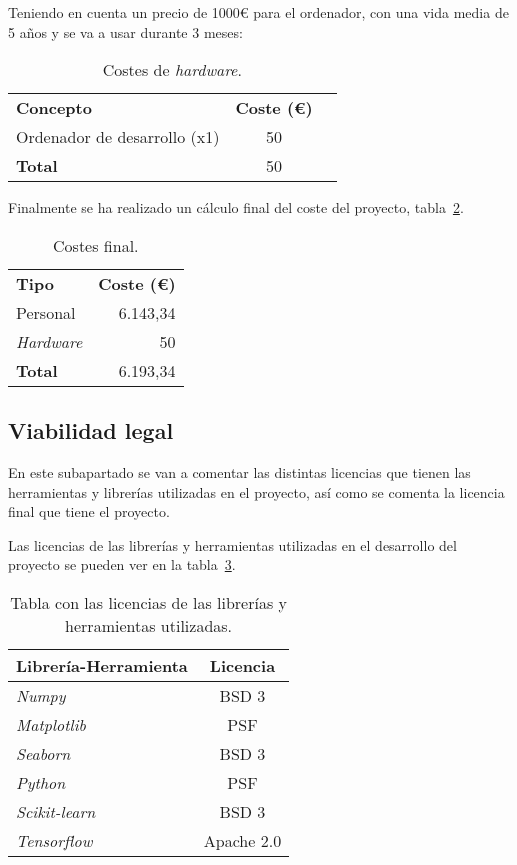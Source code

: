 Teniendo en cuenta un precio de 1000€ para el ordenador, con una vida media de 5 años y se va a usar durante 3 meses:

\begin{table}
	\centering
	\begin{tabular}[]{@{}l c r@{}}
		\toprule
		\textbf{Concepto} & \textbf{Coste (\euro{})} \\
		\otoprule
		Ordenador de desarrollo (x1) & 50 \\\hubu
		\textbf{Total} & 50 \\
		\bottomrule
	\end{tabular}
	\caption{Costes de \textit{hardware}.}
	\label{tab:costes_hardware}
\end{table}

Finalmente se ha realizado un cálculo final del coste del proyecto, tabla~\ref{tab:coste_final}.

\begin{table}
	\centering
	\begin{tabular}[]{@{}l r@{}}
		\toprule
		\textbf{Tipo} & \textbf{Coste (\euro{})}\\
		\otoprule
		Personal  & 6.143,34 \\
		\textit{Hardware}& 50 \\\hubu
		\textbf{Total}& 6.193,34\\
		\bottomrule
	\end{tabular}
	\caption{Costes final.}
	\label{tab:coste_final}
\end{table}

\subsection{Viabilidad legal}
En este subapartado se van a comentar las distintas licencias que tienen las herramientas y librerías utilizadas en el proyecto, así como se comenta la licencia final que tiene el proyecto.

Las licencias de las librerías y herramientas utilizadas en el desarrollo del proyecto se pueden ver en la tabla~\ref{tab:lic}.

\begin{table}[h]
	\centering
	\begin{tabular}{lc}
		\toprule
		\textbf{Librería-Herramienta}&\textbf{Licencia}\\
		\midrule
		\textit{Numpy} & BSD 3\\
		\textit{Matplotlib} &  PSF\\
		\textit{Seaborn} & BSD 3\\
		\textit{Python} & PSF\\
		\textit{Scikit-learn} & BSD 3\\
		\textit{Tensorflow} & Apache 2.0\\
		\bottomrule
	\end{tabular}
	\caption{Tabla con las licencias de las librerías y herramientas utilizadas.}
	\label{tab:lic}
\end{table}

